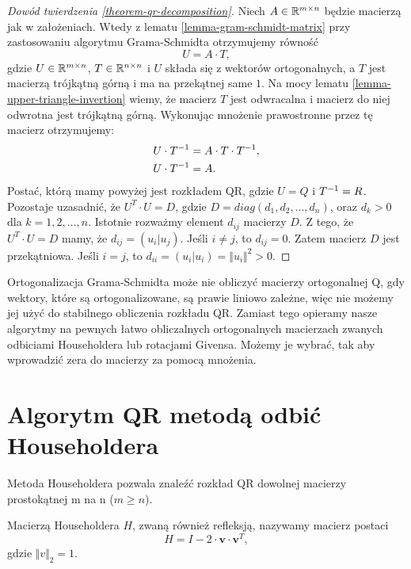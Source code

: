 \documentclass[12pt,a4paper]{report}
\newcommand{\vr}[1]{\mathbf{#1}}
\newcommand{\mx}[1]{{#1}}
\begin{document}
\begin{proof}[Dowód twierdzenia \ref{theorem-qr-decomposition}]
Niech $\mx{A} \in \setR^{m \times n}$ będzie macierzą jak w założeniach. Wtedy z lematu \ref{lemma-gram-schmidt-matrix} przy zastosowaniu algorytmu Grama-Schmidta otrzymujemy równość
$$
\mx{U} = \mx{A} \cdot \mx{T},
$$  
gdzie $\mx{U} \in \setR^{m \times n}$, $\mx{T} \in \setR^{n \times n}$ i $\mx{U}$ składa się z wektorów ortogonalnych, a $\mx{T}$ jest macierzą trójkątną górną i ma na przekątnej same $1$.  
Na mocy lematu \ref{lemma-upper-triangle-invertion} wiemy, że macierz $\mx{T}$ jest odwracalna i macierz do niej odwrotna jest trójkątną górną. Wykonując mnożenie prawostronne przez tę macierz otrzymujemy:
\begin{align*}
\mx{U} \cdot \inverse{\mx{T}} & = \mx{A}\cdot\mx{T}\cdot \inverse{\mx{T}}, \\
\mx{U} \cdot \inverse{\mx{T}} & = \mx{A}.
\end{align*}  
Postać, którą mamy powyżej jest rozkładem QR, gdzie $\mx{U} = \mx{Q}$ i $\inverse{\mx{T}} = \mx{R}$. Pozostaje uzasadnić, że $\mx{U}^{T} \cdot \mx{U} = \mx{D}$, gdzie $D= diag (d_{1}, d_{2}, ..., d_{n})$, oraz $d_{k}>0$ dla $k = 1, 2, \ldots, n$. Istotnie rozważmy element $d_{ij}$ macierzy $\mx{D}$. Z tego, że $\mx{U}^{T} \cdot \mx{U} = \mx{D}$ mamy, że $d_{ij} = (u_{i}|u_{j})$. Jeśli $i \neq j$, to $d_{ij}=0$. Zatem macierz $\mx{D}$ jest przekątniowa. Jeśli $i=j$, to $d_{ii}=(u_{i}|u_{i}) = \Vert u_{i} \Vert ^{2} >0$.

\end{proof}



Ortogonalizacja Grama-Schmidta może nie obliczyć macierzy ortogonalnej Q, gdy wektory, które są ortogonalizowane, są prawie liniowo zależne, więc nie możemy jej użyć do stabilnego obliczenia rozkładu QR. Zamiast tego opieramy nasze algorytmy na pewnych łatwo obliczalnych ortogonalnych macierzach zwanych odbiciami Householdera lub rotacjami Givensa. Możemy je wybrać, tak aby wprowadzić zera do macierzy za pomocą mnożenia.



\section{Algorytm QR metodą odbić Householdera}

Metoda Householdera pozwala znaleźć rozkład QR dowolnej macierzy prostokątnej m na n ($m\ge n$).

\begin{definition}
Macierzą Householdera $H$, zwaną również refleksją, nazywamy macierz postaci 
$$
\mx{H}=\mx{I}-2\cdot \vr{v}\cdot \vr{v}^{T},
$$
gdzie $\Vert v \Vert_{2} = 1$.
\end{definition}
\end{document}
